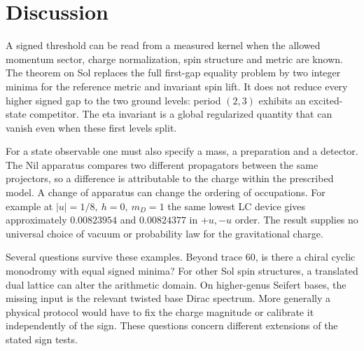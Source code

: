 \section{Discussion}
A signed threshold can be read from a measured kernel when the allowed momentum sector, charge normalization, spin structure and metric are known. The theorem on Sol replaces the full first-gap equality problem by two integer minima for the reference metric and invariant spin lift. It does not reduce every higher signed gap to the two ground levels: period \((2,3)\) exhibits an excited-state competitor. The eta invariant is a global regularized quantity that can vanish even when these first levels split.

For a state observable one must also specify a mass, a preparation and a detector. The Nil apparatus compares two different propagators between the same projectors, so a difference is attributable to the charge within the prescribed model. A change of apparatus can change the ordering of occupations. For example at \(|u|=1/8,\ h=0,\ m_D=1\) the same lowest LC device gives approximately \(0.00823954\) and \(0.00824377\) in \(+u,-u\) order. The result supplies no universal choice of vacuum or probability law for the gravitational charge.

Several questions survive these examples. Beyond trace 60, is there a chiral cyclic monodromy with equal signed minima? For other Sol spin structures, a translated dual lattice can alter the arithmetic domain. On higher-genus Seifert bases, the missing input is the relevant twisted base Dirac spectrum. More generally a physical protocol would have to fix the charge magnitude or calibrate it independently of the sign. These questions concern different extensions of the stated sign tests.
